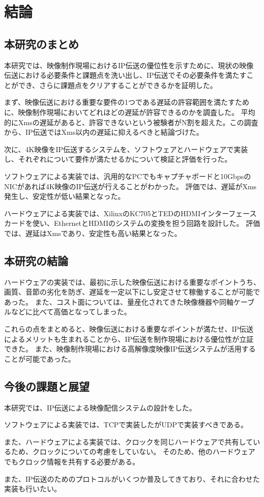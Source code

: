 \chapter{結論}
\label{chap:conclusion}

\section{本研究のまとめ}

本研究では、映像制作現場におけるIP伝送の優位性を示すために、現状の映像伝送における必要条件と課題点を洗い出し、IP伝送でその必要条件を満たすことができ、さらに課題点をクリアすることができるかを証明した。

まず、映像伝送における重要な要件の1つである遅延の許容範囲を満たすために、映像制作現場においてどれほどの遅延が許容できるのかを調査した。
平均的にXmsの遅延があると、許容できないという被験者がN割を超えた。この調査から、IP伝送ではXms以内の遅延に抑えるべきと結論づけた。

次に、4K映像をIP伝送するシステムを、ソフトウェアとハードウェアで実装し、それぞれについて要件が満たせるかについて検証と評価を行った。

ソフトウェアによる実装では、汎用的なPCでもキャプチャボードと10GbpsのNICがあれば4K映像のIP伝送が行えることがわかった。
評価では、遅延がXms発生し、安定性が低い結果となった。

ハードウェアによる実装では、XilinxのKC705とTEDのHDMIインターフェースカードを使い、EthernetとHDMIのシステムの変換を担う回路を設計した。
評価では、遅延はXmsであり、安定性も高い結果となった。

\section{本研究の結論}

ハードウェアの実装では、最初に示した映像伝送における重要なポイントうち、画質、音節の劣化を防ぎ、遅延を一定以下にし安定させて稼働することが可能であった。
また、コスト面については、量産化されてきた映像機器や同軸ケーブルなどに比べて高価となってしまった。

これらの点をまとめると、映像伝送における重要なポイントが満たせ、IP伝送によるメリットも生まれることから、IP伝送を制作現場における優位性が立証できた。
また、映像制作現場における高解像度映像IP伝送システムが活用することが可能であった。

\newpage
\section{今後の課題と展望}

本研究では、IP伝送による映像配信システムの設計をした。

ソフトウェアによる実装では、TCPで実装したがUDPで実装すべきである。

また、ハードウェアによる実装では、クロックを同じハードウェアで共有しているため、クロックについての考慮をしていない。
そのため、他のハードウェアでもクロック情報を共有する必要がある。

また、IP伝送のためのプロトコルがいくつか普及してきており、それに合わせた実装も行いたい。
